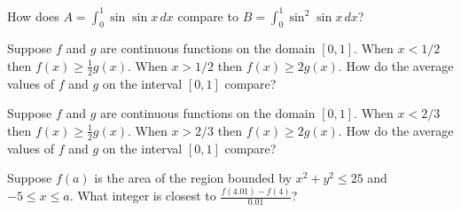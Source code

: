 \documentclass{ximera}
\newcommand{\recommendation}[1]{}
\begin{document}
\begin{shuffle}
\begin{problem}
  How does $A = \int_0^1 \sin \sin x \, dx$ compare to $B = \int_0^1 \sin^2 \sin x \, dx$?
  \begin{multipleChoice}
  \end{multipleChoice}
\end{problem}

\begin{problem}
  Suppose $f$ and $g$ are continuous functions on the domain $[0,1]$.  When $x < 1/2$ then $f(x) \geq \frac{1}{2} g(x)$.  When $x > 1/2$ then $f(x) \geq 2 g(x)$.  How do the average values of $f$ and $g$ on the interval $[0,1]$ compare?
  \begin{multipleChoice}
  \end{multipleChoice}
\end{problem}

\begin{problem}
  Suppose $f$ and $g$ are continuous functions on the domain $[0,1]$.  When $x < 2/3$ then $f(x) \geq \frac{1}{2} g(x)$.  When $x > 2/3$ then $f(x) \geq 2 g(x)$.  How do the average values of $f$ and $g$ on the interval $[0,1]$ compare?
  \begin{multipleChoice}
  \end{multipleChoice}
\end{problem}

\begin{problem}
  Suppose $f(a)$ is the area of the region bounded by $x^2 + y^2 \leq 25$ and $-5 \leq x \leq a$.  What integer is closest to $\frac{f(4.01) - f(4)}{0.01}$?
  \begin{multipleChoice}
  \end{multipleChoice}
\end{problem}


\end{shuffle}
\end{document}
